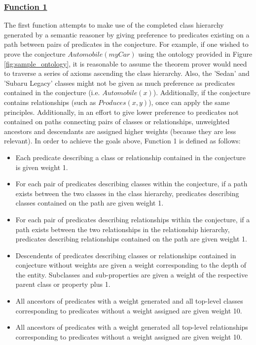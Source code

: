\documentclass{article}
\begin{document}
\subsubsection{\underline{Function 1} }

The first function attempts to make use of the completed class hierarchy generated by a semantic reasoner by giving preference to predicates existing on a path between pairs of predicates in the conjecture. For example, if one wished to prove the conjecture $Automobile(myCar)$ using the ontology provided in Figure \ref{fig:sample_ontology}, it is reasonable to assume the theorem prover would need to traverse a series of axioms ascending the class hierarchy. Also, the 'Sedan' and 'Subaru Legacy' classes might not be given as much preference as predicates contained in the conjecture (i.e. $Automobile(x)$). Additionally, if the conjecture contains relationships (such as $Produces(x,y)$), once can apply the same principles. Additionally, in an effort to give lower preference to predicates not contained on paths connecting pairs of classes or relationships, unweighted ancestors and descendants are assigned higher weights (because they are less relevant). In order to achieve the goals above, Function 1 is defined as follows: 

\begin{singlespace}
\begin{itemize}
	\item Each predicate describing a class or relationship contained in the conjecture is given weight 1. 
	\item For each pair of predicates describing classes within the conjecture, if a path exists between the two classes in the class hierarchy, predicates describing classes contained on the path are given weight 1. 
	\item For each pair of predicates describing relationships within the conjecture, if a path exists between the two relationships in the relationship hierarchy, predicates describing relationships contained on the path are given weight 1. 
	\item Descendents of predicates describing classes or relationships contained in conjecture without weights are given a weight corresponding to the depth of the entity. Subclasses and sub-properties are given a weight of the respective parent class or property plus 1. 
	\item All ancestors of predicates with a weight generated and all top-level classes corresponding to predicates without a weight assigned are given weight 10.
	\item All ancestors of predicates with a weight generated all top-level relationships corresponding to predicates without a weight assigned are given weight 10.
\end{itemize}
\end{singlespace}
\end{document}
